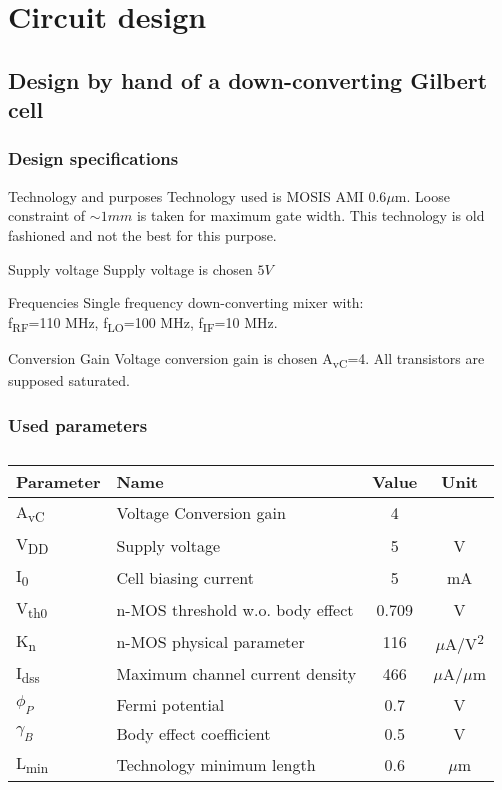 \section{Circuit design}

\subsection{Design by hand of a down-converting Gilbert cell}
\begin{frame} %
\tableofcontents[currentsubsection]
\end{frame}

\begin{frame}
\frametitle{Design specifications}
\begin{block}{Technology and purposes}
Technology used is MOSIS AMI 0.6$\mu$m. Loose constraint of $\sim 1mm$ is taken for maximum gate width. This technology is old fashioned and not the best for this purpose.
\end{block}

\begin{block}{Supply voltage}
Supply voltage is chosen $5V$ 
\end{block}

\begin{block}{Frequencies}
Single frequency down-converting mixer with: \\ f\textsubscript{RF}=110 MHz, f\textsubscript{LO}=100 MHz, f\textsubscript{IF}=10 MHz.
\end{block}
\begin{block}{Conversion Gain}
Voltage conversion gain is chosen A\textsubscript{vC}=4. All transistors are supposed saturated.
\end{block}
\end{frame}

\begin{frame}
\frametitle{Used parameters}
\begin{table} [h]
\label{tab:specs}
\caption{}
\centering	
\begin{tabular}{llcc} 
\toprule 
Parameter & Name			& Value 	& Unit \\ 
\midrule
A\textsubscript{vC} & Voltage Conversion gain & 4 & \\
V\textsubscript{DD} & Supply voltage &	5 & V		\\
I\textsubscript{0} & Cell biasing current & 5 & mA \\
V\textsubscript{th0} & n-MOS threshold w.o. body effect& 0.709 &V		\\ 
K\textsubscript{n} & n-MOS physical parameter& 116 & $\mu$A/V\textsuperscript{2}\\
I\textsubscript{dss} & Maximum channel current density & 466 & $\mu$A/$\mu$m \\
$\phi_P$ & Fermi potential & 0.7 & V \\
$\gamma_B$ & Body effect coefficient & 0.5 & V \\
L\textsubscript{min} & Technology minimum length & 0.6 & $\mu$m \\
\bottomrule 
\end{tabular}	
\end{table}	
\end{frame}

